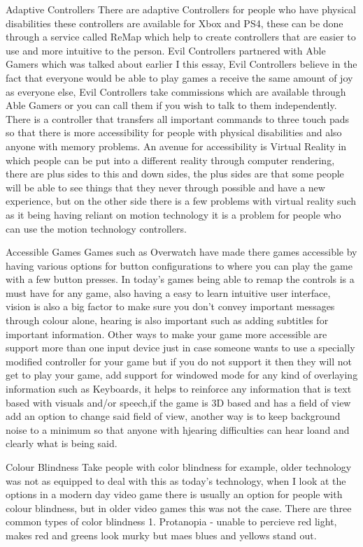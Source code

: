 \documentclass{scrartcl}
\begin{document}
Adaptive Controllers
There are adaptive Controllers for people who have physical disabilities these controllers are available for Xbox and PS4, these can be done through a service called ReMap which help to create controllers that are easier to use and more intuitive to the person.
Evil Controllers partnered with Able Gamers which was talked about earlier I this essay, Evil Controllers believe in the fact that everyone would be able to play games a receive the same amount of joy as everyone else, Evil Controllers take commissions which are available through Able Gamers or you can call them if you wish to talk to them independently.
There is a controller that transfers all important commands to three touch pads so that there is more accessibility for people with physical disabilities and also anyone with memory problems.
An avenue for accessibility is Virtual Reality in which people can be put into a different reality through computer rendering, there are plus sides to this and down sides, the plus sides are that some people will be able to see things that they never through possible and have a new experience, but on the other side there is a few problems with virtual reality such as it being having reliant on motion  technology it is a problem for people who can use the motion technology controllers.

Accessible Games
Games such as Overwatch have made there games accessible by having various options for button configurations to where you can play the game with a few button presses.
In today's games being able to remap the controls is a must have for any game, also having a easy to learn intuitive user interface, vision is also  a big factor to make sure you don't convey important messages through colour alone, hearing is also important such as adding subtitles for important information.
Other ways to make your game more accessible are support more than one input device just in case someone wants to use a specially modified controller for your game but if you do not support it then they will not get to play your game, add support for windowed mode for any kind of overlaying information such as Keyboards, it helps to reinforce any information that is text based with visuals and/or speech,if the game is 3D based and has a field of view add an option to change said field of view, another way is to keep background noise to a minimum so that anyone with hjearing difficulties can hear loand and clearly what is being said.

Colour Blindness
Take people with color blindness for example, older technology was not as equipped to deal with this as today's technology, when I look at the options in a modern day video game there is usually an option for people with colour blindness, but in older video games this was not the case.
There are three common types of color blindness
1. Protanopia - unable to percieve red light, makes red and greens look murky but maes blues and yellows stand out.
\end{document}
